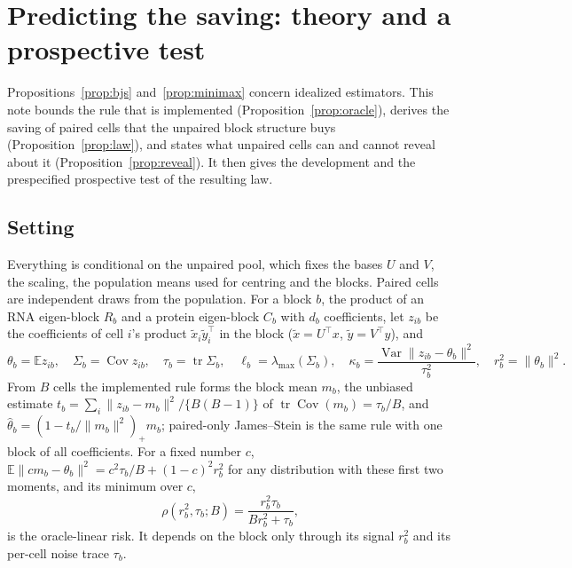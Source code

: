 \section{Predicting the saving: theory and a prospective test}\label{sec:pred}

Propositions~\ref{prop:bjs} and~\ref{prop:minimax} concern idealized estimators. This note bounds the rule that is implemented (Proposition~\ref{prop:oracle}), derives the saving of paired cells that the unpaired block structure buys (Proposition~\ref{prop:law}), and states what unpaired cells can and cannot reveal about it (Proposition~\ref{prop:reveal}). It then gives the development and the prespecified prospective test of the resulting law.

\subsection*{Setting}
Everything is conditional on the unpaired pool, which fixes the bases $U$ and $V$, the scaling, the population means used for centring and the blocks. Paired cells are independent draws from the population. For a block $b$, the product of an RNA eigen-block $R_b$ and a protein eigen-block $C_b$ with $d_b$ coefficients, let $z_{ib}$ be the coefficients of cell $i$'s product $\tilde x_i\tilde y_i^\top$ in the block ($\tilde x=U^\top x$, $\tilde y=V^\top y$), and
\[
\theta_b=\mathbb{E}z_{ib},\quad \Sigma_b=\operatorname{Cov}z_{ib},\quad \tau_b=\operatorname{tr}\Sigma_b,\quad \ell_b=\lambda_{\max}(\Sigma_b),\quad \kappa_b=\frac{\operatorname{Var}\|z_{ib}-\theta_b\|^2}{\tau_b^2},\quad r_b^2=\|\theta_b\|^2 .
\]
From $B$ cells the implemented rule forms the block mean $m_b$, the unbiased estimate $t_b=\sum_i\|z_{ib}-m_b\|^2/\{B(B-1)\}$ of $\operatorname{tr}\operatorname{Cov}(m_b)=\tau_b/B$, and $\hat\theta_b=(1-t_b/\|m_b\|^2)_+m_b$; paired-only James--Stein is the same rule with one block of all coefficients. For a fixed number $c$, $\mathbb{E}\|cm_b-\theta_b\|^2=c^2\tau_b/B+(1-c)^2r_b^2$ for any distribution with these first two moments, and its minimum over $c$,
\[
\rho(r_b^2,\tau_b;B)=\frac{r_b^2\tau_b}{Br_b^2+\tau_b},
\]
is the oracle-linear risk. It depends on the block only through its signal $r_b^2$ and its per-cell noise trace $\tau_b$.

